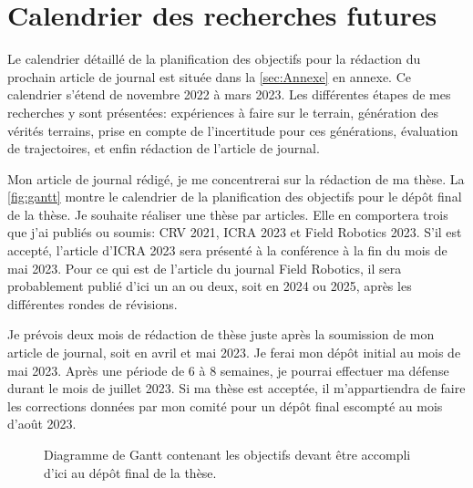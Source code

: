 \section{Calendrier des recherches futures}
\label{sec:calendrier}

Le calendrier détaillé de la planification des objectifs pour la rédaction du prochain article de journal est située dans la \autoref{sec:Annexe} en annexe.
Ce calendrier s'étend de novembre 2022 à mars 2023.
Les différentes étapes de mes recherches y sont présentées: expériences à faire sur le terrain, génération des vérités terrains, prise en compte de l'incertitude pour ces générations, évaluation de trajectoires, et enfin rédaction de l'article de journal.

Mon article de journal rédigé, je me concentrerai sur la rédaction de ma thèse.
La \autoref{fig:gantt} montre le calendrier de la planification des objectifs pour le dépôt final de la thèse.
Je souhaite réaliser une thèse par articles.
Elle en comportera trois que j'ai publiés ou soumis: CRV 2021, ICRA 2023 et Field Robotics 2023.
S'il est accepté, l'article d'ICRA 2023 sera présenté à la conférence à la fin du mois de mai 2023.
Pour ce qui est de l'article du journal Field Robotics, il sera probablement publié d'ici un an ou deux, soit en 2024 ou 2025, après les différentes rondes de révisions.

Je prévois deux mois de rédaction de thèse juste après la soumission de mon article de journal, soit en avril et mai 2023. 
Je ferai mon dépôt initial au mois de mai 2023.
Après une période de 6 à 8 semaines, je pourrai effectuer ma défense durant le mois de juillet 2023.
Si ma thèse est acceptée, il m'appartiendra de faire les corrections données par mon comité pour un dépôt final escompté au mois d'août 2023.

\setlength{\fboxsep}{9pt}
\begin{figure}[htbp]
  \centering
  
  \caption{Diagramme de Gantt contenant les objectifs devant être accompli d'ici au dépôt final de la thèse.
  }
  \label{fig:gantt}
\end{figure}
\setlength{\fboxsep}{12pt}

